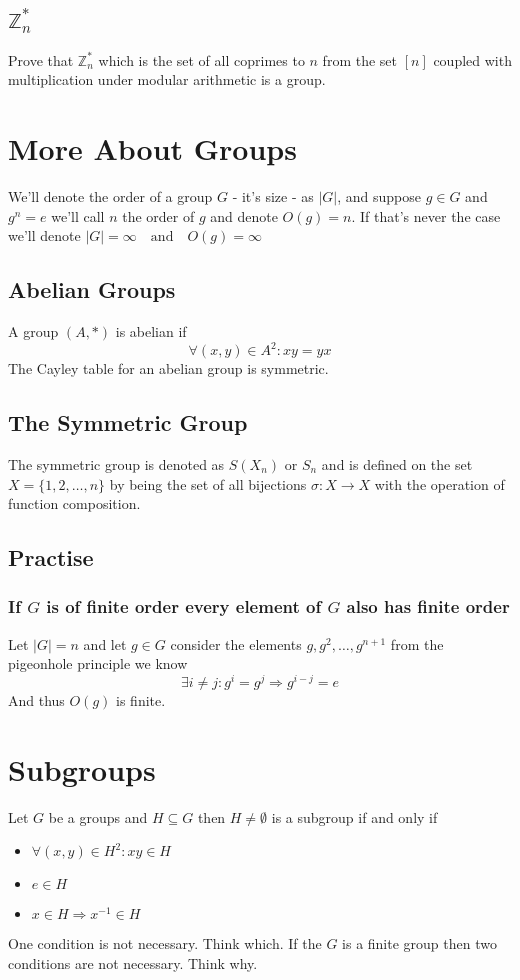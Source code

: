 \documentclass{article}
\newcommand{\Z}{\mathbb{Z}}
\begin{document}
	\subsection{$\Z^*_n$}
	Prove that $\Z^*_n$ which is the set of all coprimes to $n$ from the set $[n]$ coupled with multiplication under modular arithmetic is a group.
	\newpage
	\section{More About Groups}
	We'll denote the order of a group $G$ - it's size - as $|G|$, and suppose $g\in G$ and $g^n=e$ we'll call $n$ the order of $g$ and denote $O(g)=n$. If that's never the case we'll denote $|G|=\infty \quad\mathrm{and}\quad O(g)=\infty$
	\subsection{Abelian Groups}
	A group $(A,*)$ is abelian if
	\[
		\forall (x,y)\in A^2:xy=yx
	\]
	The Cayley table for an abelian group is symmetric.
	\subsection{The Symmetric Group}
	The symmetric group is denoted as $S(X_n)$ or $S_n$ and is defined on the set $X=\{1,2,\ldots,n\}$ by being the set of all bijections $\sigma:X\to X$ with the operation of function composition.
	\subsection{Practise}
	\subsubsection{If $G$ is of finite order every element of $G$ also has finite order}
	Let $|G|=n$ and let $g\in G$ consider the elements $g,g^2,\ldots,g^{n+1}$ from the pigeonhole principle we know
	\[
		\exists i\neq j:g^i=g^j \Rightarrow g^{i-j}=e
	\]
	And thus $O(g)$ is finite.
	
	\newpage
	\section{Subgroups}
	Let $G$ be a groups and $H\subseteq G$ then $H\neq\emptyset$ is a subgroup if and only if
	\begin{itemize}
		\item $\forall(x,y)\in H^2:xy\in H$
		\item $e\in H$
		\item $x\in H \Rightarrow x^{-1}\in H$
	\end{itemize}
	One condition is not necessary. Think which. If the $G$ is a finite group then two conditions are not necessary. Think why.
\end{document}
